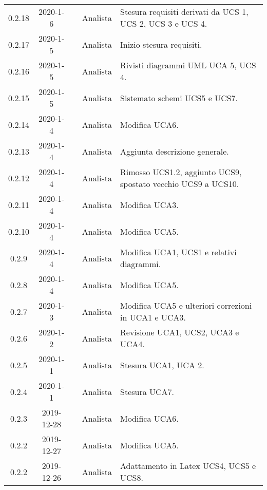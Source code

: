 {\begin{longtable}{ c c  C{4cm}  C{3cm} C{4cm}}
0.2.18 & 2020-1-6 & \CE{} & Analista & Stesura requisiti derivati da UCS 1, UCS 2, UCS 3 e UCS 4. \\

0.2.17 & 2020-1-5 & \CE{} & Analista & Inizio stesura requisiti. \\

0.2.16 & 2020-1-5 & \DF{} & Analista & Rivisti diagrammi UML UCA 5, UCS 4. \\

0.2.15 & 2020-1-5 & \PF{} & Analista & Sistemato schemi UCS5 e UCS7. \\

0.2.14 & 2020-1-4 & \PF{} & Analista & Modifica UCA6. \\

0.2.13 & 2020-1-4 & \CE{} & Analista & Aggiunta descrizione generale. \\

0.2.12 & 2020-1-4 & \CE{} & Analista & Rimosso UCS1.2, aggiunto UCS9, spostato vecchio UCS9 a UCS10. \\

0.2.11 & 2020-1-4 & \PF{} & Analista & Modifica UCA3. \\

0.2.10 & 2020-1-4 & \DF{} & Analista & Modifica UCA5. \\

0.2.9 & 2020-1-4 & \DF{} & Analista & Modifica UCA1, UCS1 e relativi diagrammi. \\

0.2.8 & 2020-1-4 & \CE{} & Analista & Modifica UCA5. \\

0.2.7 & 2020-1-3 & \CE{} & Analista & Modifica UCA5 e ulteriori correzioni in UCA1 e UCA3. \\

0.2.6 & 2020-1-2 & \CE{} & Analista & Revisione UCA1, UCS2, UCA3 e UCA4. \\

0.2.5 & 2020-1-1 & \BR{} & Analista & Stesura UCA1, UCA 2. \\

0.2.4 & 2020-1-1 & \PF{} & Analista & Stesura UCA7. \\

0.2.3 & 2019-12-28 & \DF{} & Analista & Modifica UCA6. \\

0.2.2 & 2019-12-27 & \PF{} & Analista & Modifica UCA5. \\

0.2.2 & 2019-12-26 & \CE{} & Analista & Adattamento in Latex UCS4, UCS5 e UCS8. \\


\end{longtable}}
